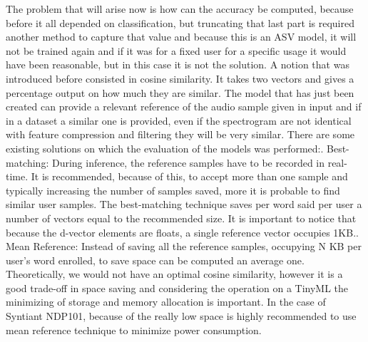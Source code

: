 The problem that will arise now is how can the accuracy be computed, because before it all depended on classification, but truncating that last part is required another method to capture that value and because this is an ASV model, it will not be trained again and if it was for a fixed user for a specific usage it would have been reasonable, but in this case it is not the solution. A notion that was introduced before consisted in cosine similarity. It takes two vectors and gives a percentage output on how much they are similar. The model that has just been created can provide a relevant reference of the audio sample given in input and if in a dataset a similar one is provided, even if the spectrogram are not identical with feature compression and filtering they will be very similar. There are some existing solutions on which the evaluation of the models was performed:. Best-matching: During inference, the reference samples have to be recorded in real-time. It is recommended, because of this, to accept more than one sample and typically increasing the number of samples saved, more it is probable to find similar user samples. The best-matching technique saves per word said per user a number of vectors equal to the recommended size. It is important to notice that because the d-vector elements are floats, a single reference vector occupies 1KB.. Mean Reference: Instead of saving all the reference samples, occupying N KB per user's word enrolled, to save space can be computed an average one. Theoretically, we would not have an optimal cosine similarity, however it is a good trade-off in space saving and considering the operation on a TinyML the minimizing of storage and memory allocation is important.\newline
In the case of Syntiant NDP101, because of the really low space is highly recommended to use mean reference technique to minimize power consumption.
